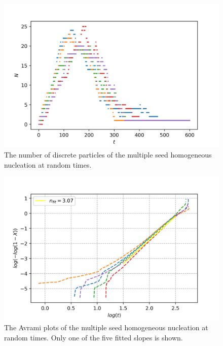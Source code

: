 \documentclass[preprint,12pt]{elsarticle}
\begin{document}
%
\begin{center}
\begin{figure} 
\begin{centering}
\includegraphics[scale=0.65]{particle_count_multiple_seed_randt.PNG}
\par\end{centering}
\caption{The number of discrete particles of the multiple seed homogeneous nucleation at random times.} \label{fig:particle_count_multiple_seed_randt}
\end{figure}
\par\end{center}
%
\begin{center}
\begin{figure} 
\begin{centering}
\includegraphics[scale=0.65]{Avrami_plot_multiple_seed_randt.PNG}
\par\end{centering}
\caption{The Avrami plots of the multiple seed homogeneous nucleation at random times. Only one of the five fitted slopes is shown.} \label{fig:avarmi_plot_multiple_seed_randt}
\end{figure}
\par\end{center}
\end{document}
